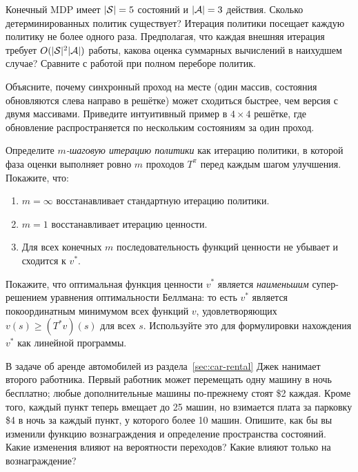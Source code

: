 \begin{exercise}
\label{ex:dp-number-of-policies}
Конечный MDP имеет $|\mathcal{S}|=5$ состояний и $|\mathcal{A}|=3$ действия.  Сколько детерминированных политик существует?  Итерация политики посещает каждую политику не более одного раза.  Предполагая, что каждая внешняя итерация требует $O(|\mathcal{S}|^2|\mathcal{A}|)$ работы, какова оценка суммарных вычислений в наихудшем случае?  Сравните с работой при полном переборе политик.
\end{exercise}

\begin{exercise}
\label{ex:dp-async}
Объясните, почему синхронный проход на месте (один массив, состояния обновляются слева направо в решётке) может сходиться быстрее, чем версия с двумя массивами.  Приведите интуитивный пример в $4\times4$ решётке, где обновление распространяется по нескольким состояниям за один проход.
\end{exercise}

\begin{exercise}
\label{ex:dp-truncated}
Определите \emph{$m$-шаговую итерацию политики} как итерацию политики, в которой фаза оценки выполняет ровно $m$ проходов $T^\pi$ перед каждым шагом улучшения.  Покажите, что:
\begin{enumerate}[label=(\alph*)]
  \item $m=\infty$ восстанавливает стандартную итерацию политики.
  \item $m=1$ восстанавливает итерацию ценности.
  \item Для всех конечных $m$ последовательность функций ценности не убывает и сходится к $v^*$.
\end{enumerate}
\end{exercise}

\begin{exercise}
\label{ex:dp-bellman-lp}
Покажите, что оптимальная функция ценности $v^*$ является \emph{наименьшим} супер-решением уравнения оптимальности Беллмана: то есть $v^*$ является покоординатным минимумом всех функций $v$, удовлетворяющих $v(s) \ge (T^* v)(s)$ для всех $s$.  Используйте это для формулировки нахождения $v^*$ как линейной программы.
\end{exercise}

\begin{exercise}
\label{ex:dp-car-rental}
В задаче об аренде автомобилей из раздела~\ref{sec:car-rental} Джек нанимает второго работника.  Первый работник может перемещать одну машину в ночь бесплатно; любые дополнительные машины по-прежнему стоят \$2 каждая.  Кроме того, каждый пункт теперь вмещает до 25 машин, но взимается плата за парковку \$4 в ночь за каждый пункт, у которого более 10 машин.  Опишите, как бы вы изменили функцию вознаграждения и определение пространства состояний.  Какие изменения влияют на вероятности переходов?  Какие влияют только на вознаграждение?
\end{exercise}

